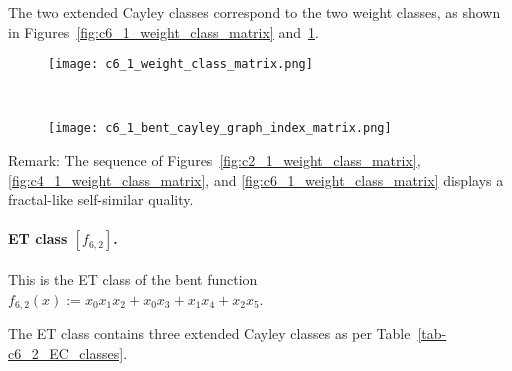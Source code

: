 
The two extended Cayley classes correspond to the two weight classes,
as shown in Figures~\ref{fig:c6_1_weight_class_matrix} and~\ref{fig:c6_1_bent_cayley_graph_index_matrix}.

\begin{figure}[!bhpt] %
\centering
\begin{minipage}{.48\textwidth}
  \centering
  \texttt{[image: c6\_1\_weight\_class\_matrix.png]}
  \label{fig:c6_1_weight_class_matrix}
\end{minipage}%
~~~~
\begin{minipage}{.48\textwidth}
  \centering
  \texttt{[image: c6\_1\_bent\_cayley\_graph\_index\_matrix.png]}
  \label{fig:c6_1_bent_cayley_graph_index_matrix}
\end{minipage}
\end{figure}
Remark: The sequence of Figures~\ref{fig:c2_1_weight_class_matrix}, \ref{fig:c4_1_weight_class_matrix},
and \ref{fig:c6_1_weight_class_matrix} displays a fractal-like self-similar quality.

\paragraph*{ET class $[f_{6,2}]$.}
%
This is the ET class of the bent function
$f_{6,2}(x) := x_{0} x_{1} x_{2} + x_{0} x_{3} + x_{1} x_{4} + x_{2} x_{5}$.

The ET class contains three extended Cayley classes as per Table~\ref{tab-c6_2_EC_classes}.

